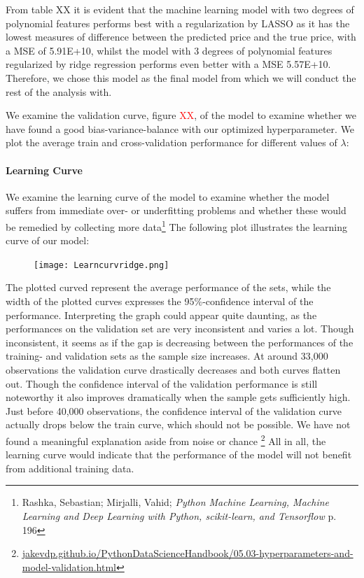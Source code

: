 \documentclass[12pt,a4paper]{article}
\begin{document}
From table XX it is evident that the machine learning model with two degrees of polynomial features performs best with a regularization by LASSO as it has the lowest measures of difference between the predicted price and the true price, with a MSE of 5.91E+10, whilst the model with 3 degrees of polynomial features regularized by ridge regression performs even better with a MSE 5.57E+10. Therefore, we chose this model as the final model from which we will conduct the rest of the analysis with. \newline

We examine the validation curve, figure \textcolor{red}{XX}, of the model to examine whether we have found a good bias-variance-balance with our optimized hyperparameter. We plot the average train and cross-validation performance for different values of $\lambda$: 

\paragraph{Learning Curve}
We examine the learning curve of the model to examine whether the model suffers from immediate over- or underfitting problems and whether these would be remedied by collecting more data\footnote{Rashka, Sebastian; Mirjalli, Vahid; \textit{Python Machine Learning, Machine Learning and Deep Learning with Python, scikit-learn, and Tensorflow} p. 196}
The following plot illustrates the learning curve of our model:
\begin{figure}[H]
\centering
\caption{}
\texttt{[image: Learncurvridge.png]}
\end{figure}
The plotted curved represent the average performance of the sets, while the width of the plotted curves expresses the 95\%-confidence interval of the performance.  
Interpreting the graph could appear quite daunting, as the performances on the validation set are very inconsistent and varies a lot. Though inconsistent, it seems as if the gap is decreasing between the performances of the training- and validation sets as the sample size increases. 
At around 33,000 observations the validation curve drastically decreases and both curves flatten out. Though the confidence interval of the validation performance is still noteworthy it also improves dramatically when the sample gets sufficiently high. Just before 40,000 observations, the confidence interval of the validation curve actually drops below the train curve, which should not be possible. We have not found a meaningful explanation aside from noise or chance \footnote{\href{https://jakevdp.github.io/PythonDataScienceHandbook/05.03-hyperparameters-and-model-validation.html}{jakevdp.github.io/PythonDataScienceHandbook/05.03-hyperparameters-and-model-validation.html}} 
All in all, the learning curve would indicate that the performance of the model will not benefit from additional training data. 
\end{document}
